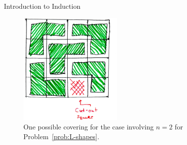 \begin{section}{Introduction to Induction}
\begin{figure}[ht]
\begin{center}
\includegraphics[width=2in]{L-shapes.jpg}
\end{center}
\vspace{-.5cm}
\caption{One possible covering for the case involving $n=2$ for Problem~\ref{prob:L-shapes}.}
\label{fig:L-shapes}
\end{figure}

\end{section}